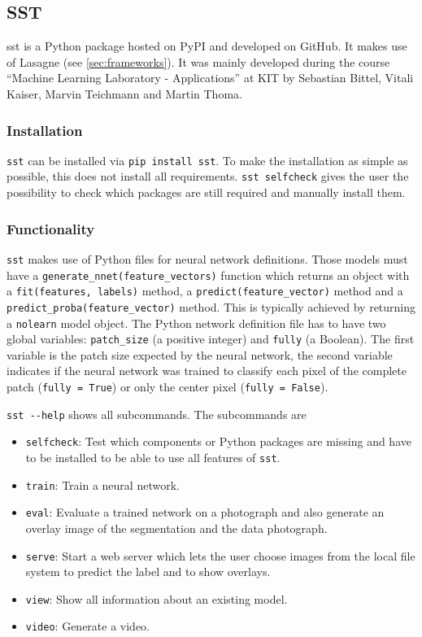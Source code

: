 
\subsection{SST}\label{sec:sst}
\Gls{sst} is a Python package hosted on \gls{PyPI} and developed on GitHub.
It makes use of Lasagne (see \cref{sec:frameworks}). It was mainly developed
during the course \enquote{Machine Learning Laboratory - Applications} at
KIT by Sebastian Bittel, Vitali Kaiser, Marvin Teichmann and Martin Thoma.

\subsubsection{Installation}
\verb+sst+ can be installed via \verb+pip install sst+. To make the
installation as simple as possible, this does not install all requirements.
\verb+sst selfcheck+ gives the user the possibility to check which packages
are still required and manually install them.

\subsubsection{Functionality}
\verb+sst+ makes use of Python files for neural network definitions. Those
models must have a \verb+generate_nnet(feature_vectors)+ function which
returns an object with a \verb+fit(features, labels)+ method, a
\verb+predict(feature_vector)+ method and a
\verb+predict_proba(feature_vector)+ method. This is typically achieved by
returning a \verb+nolearn+ model object. The Python network definition file
has to have two global variables: \verb+patch_size+ (a positive integer) and
\verb+fully+ (a Boolean). The first variable is the patch size expected by the
neural network, the second variable indicates if the neural network was trained
to classify each pixel of the complete patch (\verb+fully = True+) or only the
center pixel (\verb+fully = False+).

\verb+sst --help+ shows all subcommands. The subcommands are

\begin{itemize}
    \item \verb+selfcheck+: Test which components or Python packages are
                            missing and have to be installed to be able to use
                            all features of \verb+sst+.
    \item \verb+train+: Train a neural network.
    \item \verb+eval+: Evaluate a trained network on a photograph and also
                       generate an overlay image of the segmentation and the
                       data photograph.
    \item \verb+serve+: Start a web server which lets the user choose images
                        from the local file system to predict the label and to
                        show overlays.
    \item \verb+view+: Show all information about an existing model.
    \item \verb+video+: Generate a video.
\end{itemize}